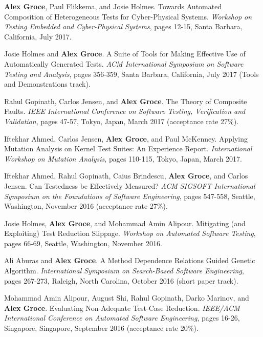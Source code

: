 \documentclass[ComputerScience]{vita}
\begin{document}
\begin{vita}
\begin{Refereed Conference and Workshop Publications}
\item {\bf Alex Groce}, Paul Flikkema, and Josie Holmes.
\newblock Towards Automated Composition of Heterogeneous Tests for Cyber-Physical Systems.
\newblock \emph{Workshop on Testing Embedded and Cyber-Physical Systems}, pages 12-15, Santa Barbara, California, July 2017.

\item Josie Holmes and {\bf Alex Groce}.
\newblock A Suite of Tools for Making Effective Use of Automatically Generated Tests.
\newblock \emph{ACM International Symposium on Software Testing and Analysis}, pages 356-359, Santa Barbara, California, July 2017 (Tools and Demonstrations track).

\item Rahul Gopinath, Carlos Jensen, and {\bf Alex Groce}.
\newblock The Theory of Composite Faults.
\newblock \emph{IEEE International Conference on Software Testing, Verification and Validation}, pages 47-57, Tokyo, Japan, March 2017 (acceptance rate 27\%).

\item Iftekhar Ahmed, Carlos Jensen, {\bf Alex Groce}, and Paul McKenney.
\newblock Applying Mutation Analysis on Kernel Test Suites: An Experience Report.
\newblock \emph{International Workshop on Mutation Analysis}, pages 110-115, Tokyo, Japan, March 2017.

\item Iftekhar Ahmed, Rahul Gopinath, Caius Brindescu, {\bf Alex Groce}, and Carlos Jensen.
\newblock Can Testedness be Effectively Measured?
\newblock \emph{ACM SIGSOFT International Symposium on the Foundations of Software Engineering},  pages 547-558, Seattle, Washington, November 2016 (acceptance rate 27\%).

\item Josie Holmes, {\bf Alex Groce}, and Mohammad Amin Alipour.
\newblock Mitigating (and Exploiting) Test Reduction Slippage.
\newblock \emph{Workshop on Automated Software Testing}, pages 66-69, Seattle, Washington, November 2016.

\item Ali Aburas and {\bf Alex Groce}.
\newblock A Method Dependence Relations Guided Genetic Algorithm.
\newblock \emph{International Symposium on Search-Based Software Engineering}, pages 267-273, Raleigh, North Carolina, October 2016 (short paper track).

\item Mohammad Amin Alipour, August Shi, Rahul Gopinath, Darko Marinov, and {\bf Alex Groce}.
\newblock Evaluating Non-Adequate Test-Case Reduction.
\newblock \emph{IEEE/ACM International Conference on Automated Software Engineering}, pages 16-26, Singapore, Singapore, September 2016 (acceptance rate 20\%).


\end{Refereed Conference and Workshop Publications}
\end{vita}
\end{document}

